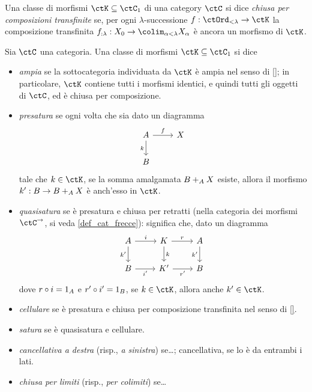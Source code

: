 \begin{definition}
	Una classe di morfismi \(\ctK\subseteq\ctC_1\) di una category \(\ctC\) si dice \emph{chiusa per composizioni transfinite} se, per ogni \(\lambda\)-successione \(f : \ctOrd_{<\lambda}\to\ctK\) la composizione transfinita \(f_{:\lambda} : X_0\to \colim_{\alpha < \lambda} X_\alpha\) è ancora un morfismo di \(\ctK\).
\end{definition}
\begin{definition}
	Sia \(\ctC\) una categoria. Una classe di morfismi \(\ctK\subseteq\ctC_1\) si dice
	\begin{itemize}
		\item \emph{ampia} se la sottocategoria individuata da \(\ctK\) è ampia nel senso di \ref{}; in particolare, \(\ctK\) contiene tutti i morfismi identici, e quindi tutti gli oggetti di \(\ctC\), ed è chiusa per composizione.
		\item \emph{presatura} se ogni volta che sia dato un diagramma
		      \[
			      \begin{tikzcd}
				      A \ar[d, "k"']\ar[r, "f"]& X \\
				      B &
			      \end{tikzcd}
		      \]
		      tale che \(k\in\ctK\), se la somma amalgamata \(\push BXA\) esiste, allora il morfismo \(k' : B\to \push BXA\) è anch'esso in \(\ctK\).
		\item \emph{quasisatura} se è presatura e chiusa per retratti (nella categoria dei morfismi \(\ctC^\to\), si veda \ref{def_cat_frecce}): significa che, dato un diagramma
		      \[
			      \begin{tikzcd}
				      A \ar[r, "i"]\ar[d, "k'"'] & K \ar[r, "r"]\ar[d, "k"]& A \ar[d, "k'"']\\
				      B \ar[r, "i'"'] & K' \ar[r, "r'"'] & B
			      \end{tikzcd}
		      \]
		      dove \(r\cmp i = 1_A\) e \(r'\cmp i' = 1_B\), se \(k\in \ctK\), allora anche \(k'\in\ctK\).
		\item \emph{cellulare} se è presatura e chiusa per composizione transfinita nel senso di \ref{}.
		\item \emph{satura} se è quasisatura e cellulare.
		\item \emph{cancellativa a destra} (risp., \emph{a sinistra}) se\dots; cancellativa, se lo è da entrambi i lati.
		\item \emph{chiusa per limiti} (risp., \emph{per colimiti}) se\dots
	\end{itemize}
\end{definition}
\begin{examples}
\end{examples}
